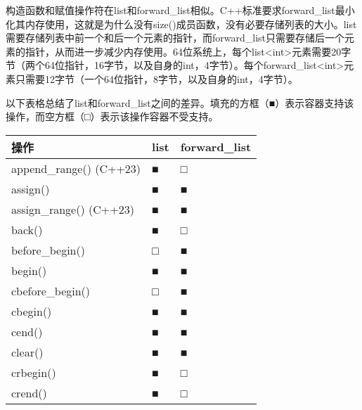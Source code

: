 构造函数和赋值操作符在list和forward\_list相似。C++标准要求forward\_list最小化其内存使用，这就是为什么没有size()成员函数，没有必要存储列表的大小。list需要存储列表中前一个和后一个元素的指针，而forward\_list只需要存储后一个元素的指针，从而进一步减少内存使用。64位系统上，每个list<int>元素需要20字节（两个64位指针，16字节，以及自身的int，4字节）。每个forward\_list<int>元素只需要12字节（一个64位指针，8字节，以及自身的int，4字节）。

以下表格总结了list和forward\_list之间的差异。填充的方框（■）表示容器支持该操作，而空方框（□）表示该操作容器不受支持。

\begin{longtable}{|l|l|l|}
\hline
\textbf{操作}                           & \textbf{list} & \textbf{forward\_list} \\ \hline
\endfirsthead
%
\endhead
%
append\_range() (C++23)                      & ■             & □                      \\ \hline
assign()                                     & ■             & ■                      \\ \hline
assign\_range() (C++23)                      & ■             & ■                      \\ \hline
back()                                       & ■             & □                      \\ \hline
before\_begin()                              & □             & ■                      \\ \hline
begin()                                      & ■             & ■                      \\ \hline
cbefore\_begin()                             & □             & ■                      \\ \hline
cbegin()                                     & ■             & ■                      \\ \hline
cend()                                       & ■             & ■                      \\ \hline
clear()                                      & ■             & ■                      \\ \hline
crbegin()                                    & ■             & □                      \\ \hline
crend()                                      & ■             & □                      \\ \hline

\end{longtable}
